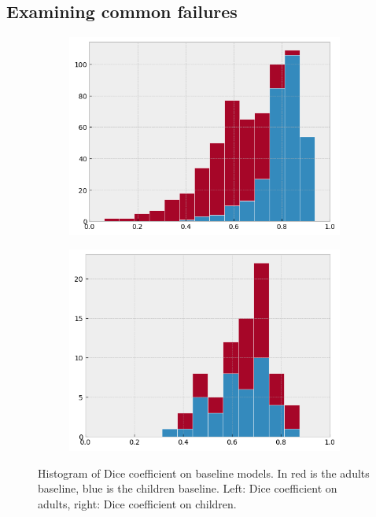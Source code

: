 \subsection{Examining common failures}

\begin{figure}[htb]
  \begin{subfigure}[b]{0.5\linewidth}
    \centering
    \includegraphics[width=0.95\linewidth]{img_transfer/hist_adults} 
  \end{subfigure}%
  \begin{subfigure}[b]{0.5\linewidth}
    \centering
    \includegraphics[width=0.95\linewidth]{img_transfer/hist_children} 
  \end{subfigure} 
  \caption{Histogram of Dice coefficient on baseline models. In red is the adults baseline, blue is the children baseline. Left: Dice coefficient on adults, right: Dice coefficient on children.}
  \label{fig:hist} 
\end{figure}

